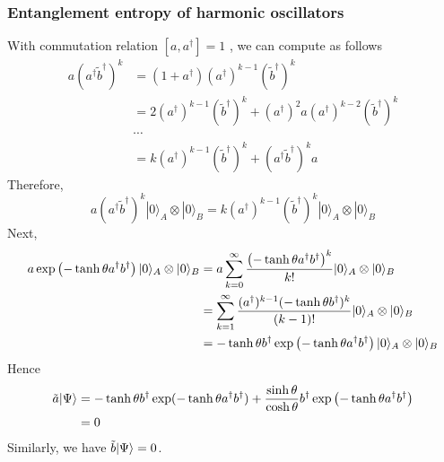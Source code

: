 \subsubsection{Entanglement entropy of harmonic oscillators}
With commutation relation $[a, a^{\dag}]=1$ , we can compute as follows
\begin{equation}
	\begin{split}
	a(a^{\dagger}\tilde{b}^{\dagger})^k &= (1+ a^{\dagger})(a^{\dagger})^{k-1}(\tilde{b}^{\dagger})^{k} \\
	&= 2(a^{\dagger})^{k-1}(\tilde{b}^{\dagger})^{k} + (a^{\dagger})^2 a(a^{\dagger})^{k-2}(\tilde{b}^{\dagger})^k\\
	& \cdots\\
	&= k (a^{\dagger})^{k-1}(\tilde{b}^{\dagger})^{k} + (a^{\dagger} \tilde{b}^{\dagger})^{k} a
	\end{split}
\end{equation}
Therefore,
\begin{equation}
	a(a^{\dagger}\tilde{b}^{\dagger})^k |0\rangle_A \otimes |0\rangle_B = k(a^{\dagger})^{k-1} (\tilde{b}^{\dagger})^{k} |0 \rangle_A \otimes |0 \rangle_B
\end{equation}
Next, 
\begin{equation}
	\begin{split}
	a \exp\left(-\tanh \theta a^{\dagger} b^{\dagger} \right) | 0 \rangle_A \otimes | 0 \rangle_B  &= a \sum_{k=0}^{\infty} \frac{\left(-\tanh \theta a^{\dagger} b^{\dagger} \right)^k}{k!} | 0 \rangle_A \otimes | 0 \rangle_B \\
	& =\sum_{k=1}^{\infty} \frac{(a^{\dagger})^{k-1}(-\tanh \theta b^{\dagger})^k }{(k-1)!}| 0 \rangle_A \otimes | 0 \rangle_B\\
	& = -\tanh\theta b^{\dagger}\exp\left(- \tanh\theta a^{\dagger}b^{\dagger} \right) | 0 \rangle_A \otimes | 0 \rangle_B
	\end{split}
\end{equation}
Hence 
\begin{equation}
	\begin{split}
	\tilde{a} | \Psi \rangle & = - \tanh\theta b^{\dagger} \exp(-\tanh \theta a^{\dagger}b^{\dagger}) + \frac{\sinh \theta}{\cosh \theta} b^{\dagger} \exp\left(-\tanh\theta a^{\dagger} b^{\dagger} \right)\\
	&= 0
	\end{split}
\end{equation}
Similarly, we have $\tilde{b}| \Psi \rangle=0$.
